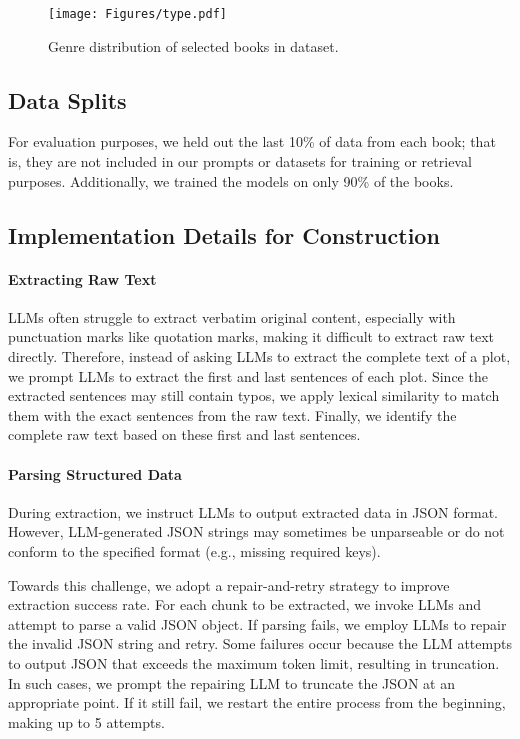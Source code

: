 \begin{figure}[htbp]
    \centering
    \texttt{[image: Figures/type.pdf]}
    \caption{Genre distribution of selected books in \method dataset.
    }
    \label{fig:type}
\end{figure}

\subsection{Data Splits}
For evaluation purposes, we held out the last 10\% of data from each book; that is, they are not included in our prompts or datasets for training or retrieval purposes. Additionally, we trained the \method models on only 90\% of the books. 

\subsection{Implementation Details for Construction}


\paragraph{Extracting Raw Text} 
LLMs often struggle to extract verbatim original content, especially with punctuation marks like quotation marks, making it difficult to extract raw text directly. 
Therefore, instead of asking LLMs to extract the complete text of a plot, we prompt LLMs to extract the first and last sentences of each plot. 
Since the extracted sentences may still contain typos, we apply lexical similarity to match them with the exact sentences from the raw text. 
Finally, we identify the complete raw text based on these first and last sentences.

\paragraph{Parsing Structured Data} 
During extraction, we instruct LLMs to output extracted data in JSON format. 
However, LLM-generated JSON strings may sometimes be unparseable or do not conform to the specified format (e.g., missing required keys). 

Towards this challenge, we adopt a repair-and-retry strategy to improve extraction success rate.
For each chunk to be extracted, we invoke LLMs and attempt to parse a valid JSON object.
If parsing fails, we employ LLMs to repair the invalid JSON string and retry. 
Some failures occur because the LLM attempts to output JSON that exceeds the maximum token limit, resulting in truncation. 
In such cases, we prompt the repairing LLM to truncate the JSON at an appropriate point. 
If it still fail, we restart the entire process from the beginning, making up to 5 attempts.

